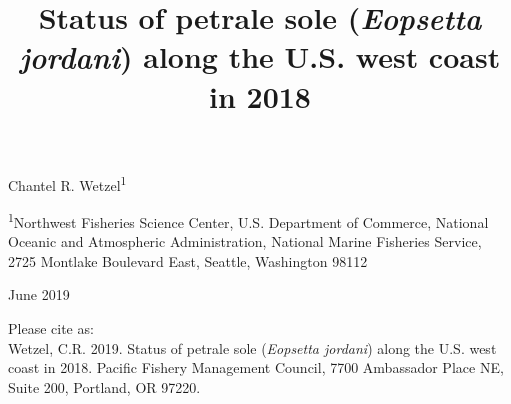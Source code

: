 \documentclass[12pt,]{article}
\title{Status of petrale sole (\emph{Eopsetta jordani}) along the U.S. west
coast in 2018}
\author{}
\date{}
\begin{document}
\maketitle


\begin{center}
\thispagestyle{empty}


\vspace{.5cm}




Chantel R. Wetzel\textsuperscript{1}\\


\vspace{.5cm}

\small
\textsuperscript{1}Northwest Fisheries Science Center, U.S. Department of Commerce, National Oceanic and Atmospheric Administration, National Marine Fisheries Service, 2725 Montlake Boulevard East, Seattle, Washington 98112\\

\vspace{.3cm}





\vspace{1cm}

\vfill
June 2019


\vspace{.3cm}

\newpage

\vspace{3cm}

Please cite as:\\

Wetzel, C.R. 2019. Status of petrale sole (\textit{Eopsetta jordani}) along the U.S. west coast in 2018. Pacific Fishery Management Council, 7700 Ambassador Place NE, Suite 200, Portland, OR 97220. 

\vspace{3cm}

\maketitle






\setcounter{page}{1}
\end{center}
\end{document}
